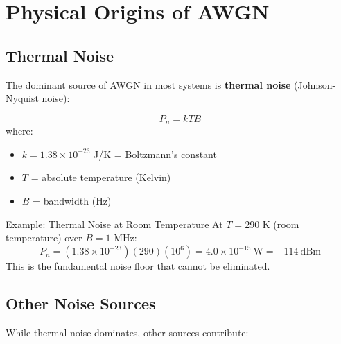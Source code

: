 \section{Physical Origins of AWGN}

\subsection{Thermal Noise}

The dominant source of AWGN in most systems is \textbf{thermal noise} (Johnson-Nyquist noise):

\begin{equation}
P_n = kTB
\end{equation}
where:

\begin{itemize}
\item $k = 1.38 \times 10^{-23}$ J/K = Boltzmann's constant
\item $T$ = absolute temperature (Kelvin)
\item $B$ = bandwidth (Hz)
\end{itemize}

\begin{calloutbox}{Example: Thermal Noise at Room Temperature}
At $T = 290$ K (room temperature) over $B = 1$ MHz:
\begin{equation}
P_n = (1.38 \times 10^{-23})(290)(10^6) = 4.0 \times 10^{-15}\ \text{W} = -114\ \text{dBm}
\end{equation}
This is the fundamental noise floor that cannot be eliminated.
\end{calloutbox}

\subsection{Other Noise Sources}

While thermal noise dominates, other sources contribute:


